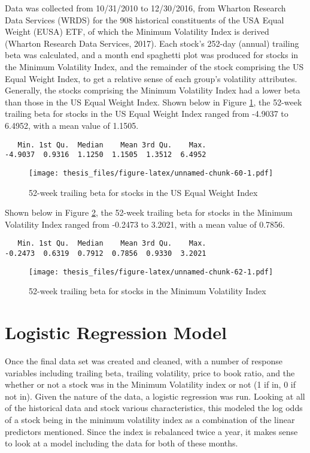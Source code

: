 \documentclass[12pt,twoside]{reedthesis}
\theoremstyle{definition}
\theoremstyle{definition}
\theoremstyle{definition}
\theoremstyle{remark}
\begin{document}
Data was collected from 10/31/2010 to 12/30/2016, from Wharton Research
Data Services (WRDS) for the 908 historical constituents of the USA
Equal Weight (EUSA) ETF, of which the Minimum Volatility Index is
derived (Wharton Research Data Services, 2017). Each stock's 252-day
(annual) trailing beta was calculated, and a month end spaghetti plot
was produced for stocks in the Minimum Volatility Index, and the
remainder of the stock comprising the US Equal Weight Index, to get a
relative sense of each group's volatility attributes. Generally, the
stocks comprising the Minimum Volatility Index had a lower beta than
those in the US Equal Weight Index. Shown below in Figure
\ref{fig:vol3}, the 52-week trailing beta for stocks in the US Equal
Weight Index ranged from -4.9037 to 6.4952, with a mean value of 1.1505.
\begin{verbatim}
   Min. 1st Qu.  Median    Mean 3rd Qu.    Max. 
-4.9037  0.9316  1.1250  1.1505  1.3512  6.4952 
\end{verbatim}
\begin{figure}[htbp]
\centering
\texttt{[image: thesis\_files/figure-latex/unnamed-chunk-60-1.pdf]}
\caption{\label{fig:unnamed-chunk-60}52-week trailing beta for stocks in the
US Equal Weight Index\label{fig:vol3}}
\end{figure}
\clearpage  Shown below in Figure \ref{fig:vol4}, the 52-week trailing
beta for stocks in the Minimum Volatility Index ranged from -0.2473 to
3.2021, with a mean value of 0.7856.
\begin{verbatim}
   Min. 1st Qu.  Median    Mean 3rd Qu.    Max. 
-0.2473  0.6319  0.7912  0.7856  0.9330  3.2021 
\end{verbatim}
\begin{figure}[htbp]
\centering
\texttt{[image: thesis\_files/figure-latex/unnamed-chunk-62-1.pdf]}
\caption{\label{fig:unnamed-chunk-62}52-week trailing beta for stocks in the
Minimum Volatility Index\label{fig:vol4}}
\end{figure}
\chapter{Logistic Regression Model}\label{logistic-regression-model}

Once the final data set was created and cleaned, with a number of
response variables including trailing beta, trailing volatility, price
to book ratio, and the whether or not a stock was in the Minimum
Volatility index or not (1 if in, 0 if not in). Given the nature of the
data, a logistic regression was run. Looking at all of the historical
data and stock various characteristics, this modeled the log odds of a
stock being in the minimum volatility index as a combination of the
linear predictors mentioned. Since the index is rebalanced twice a year,
it makes sense to look at a model including the data for both of these
months.
\end{document}
